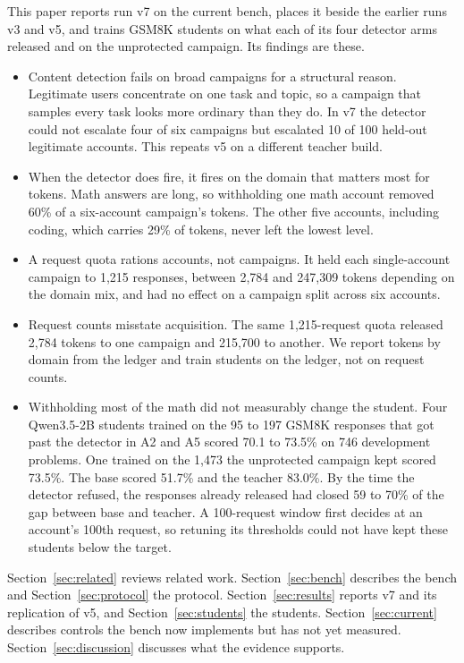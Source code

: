 \documentclass[journal]{IEEEtran}
\begin{document}
This paper reports run v7 on the current bench, places it beside the earlier runs v3 and v5, and trains GSM8K students on what each of its four detector arms released and on the unprotected campaign. Its findings are these.
\begin{itemize}
	\item Content detection fails on broad campaigns for a structural reason. Legitimate users concentrate on one task and topic, so a campaign that samples every task looks more ordinary than they do. In v7 the detector could not escalate four of six campaigns but escalated 10 of 100 held-out legitimate accounts. This repeats v5 on a different teacher build.
	\item When the detector does fire, it fires on the domain that matters most for tokens. Math answers are long, so withholding one math account removed 60\% of a six-account campaign's tokens. The other five accounts, including coding, which carries 29\% of tokens, never left the lowest level.
	\item A request quota rations accounts, not campaigns. It held each single-account campaign to 1,215 responses, between 2,784 and 247,309 tokens depending on the domain mix, and had no effect on a campaign split across six accounts.
	\item Request counts misstate acquisition. The same 1,215-request quota released 2,784 tokens to one campaign and 215,700 to another. We report tokens by domain from the ledger and train students on the ledger, not on request counts.
	\item Withholding most of the math did not measurably change the student. Four Qwen3.5-2B students trained on the 95 to 197 GSM8K responses that got past the detector in A2 and A5 scored 70.1 to 73.5\% on 746 development problems. One trained on the 1,473 the unprotected campaign kept scored 73.5\%. The base scored 51.7\% and the teacher 83.0\%. By the time the detector refused, the responses already released had closed 59 to 70\% of the gap between base and teacher. A 100-request window first decides at an account's 100th request, so retuning its thresholds could not have kept these students below the target.
\end{itemize}

Section~\ref{sec:related} reviews related work. Section~\ref{sec:bench} describes the bench and Section~\ref{sec:protocol} the protocol. Section~\ref{sec:results} reports v7 and its replication of v5, and Section~\ref{sec:students} the students. Section~\ref{sec:current} describes controls the bench now implements but has not yet measured. Section~\ref{sec:discussion} discusses what the evidence supports.
\end{document}
